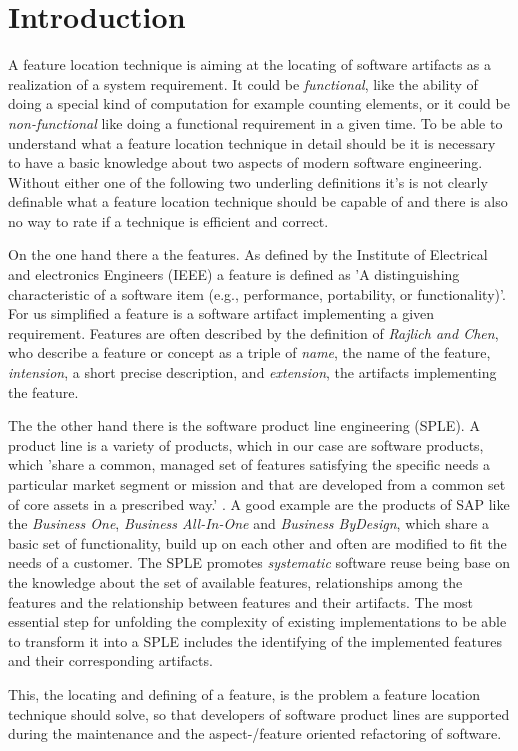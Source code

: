 \chapter{Introduction}


A feature location technique is aiming at the locating of software artifacts as a realization of a system requirement. It could be \emph{functional}, like the ability of doing a special kind of computation for example counting elements, or it could be \emph{non-functional} like doing a functional requirement in a given time.
To be able to understand what a feature location technique in detail should be it is necessary to have a basic knowledge about two aspects of modern software engineering. Without either one of the following two underling definitions it's is not clearly definable what a feature location technique should be capable of and there is also no way to rate if a technique is efficient and correct.

On the one hand there a the features. As defined by the Institute of Electrical and electronics Engineers (IEEE) a feature is defined as 'A distinguishing characteristic of a software item (e.g., performance, portability, or functionality)'.\cite{wiki:Softwarefeature} For us simplified a feature is a software artifact implementing a given requirement. Features are often described by the definition of \emph{Rajlich and Chen}, who describe a feature or concept as a triple of \textit{name}, the name of the feature, \textit{intension}, a short precise description, and \textit{extension}, the artifacts implementing the feature.\cite{KR00} \label{Rajlich_Chen}

The the other hand there is the software product line engineering (SPLE). A product line is a variety of products, which in our case are software products, which 'share a common, managed set of features satisfying the specific needs a particular market segment or mission and that are developed from a common set of core assets in a prescribed way.' \cite{SPL}.
A good example are the products of  SAP like the \emph{Business One}, \emph{Business All-In-One} and \emph{Business ByDesign}, which share a basic set of functionality, build up on each other and often are modified to fit the needs of a customer.
The SPLE promotes \textit{systematic}  software reuse being base on the knowledge about the set of available features, relationships among the features and the relationship between features and their artifacts.
The most essential step for unfolding the complexity of existing implementations to be able to transform it into a SPLE includes the identifying of the implemented features and their corresponding artifacts.

This, the locating and defining of a feature, is the problem a feature location technique should solve, so that developers of software product lines are supported during the maintenance and the aspect-/feature oriented refactoring of software. 
